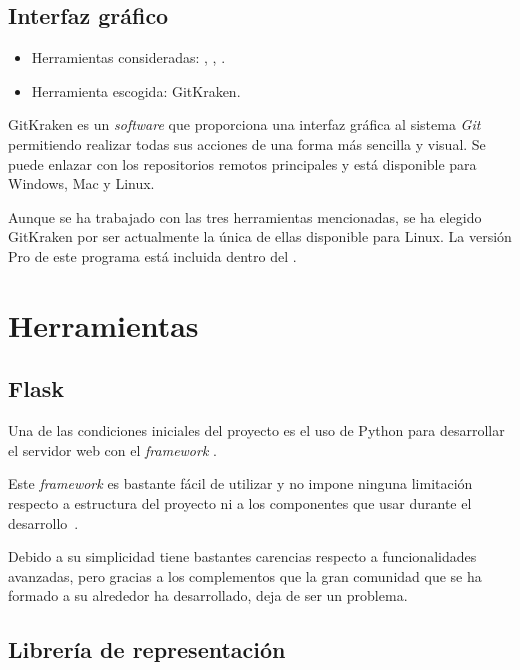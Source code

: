 \subsection{Interfaz gráfico}

\begin{itemize}
	\tightlist
	\item Herramientas consideradas:
	,
	,
	.
	\item Herramienta escogida: GitKraken.
\end{itemize}

GitKraken es un \textit{software} que proporciona una interfaz gráfica al
sistema \textit{Git} permitiendo realizar todas sus acciones de una forma más
sencilla y visual. Se puede enlazar con los repositorios remotos principales y
está disponible para Windows, Mac y Linux.

Aunque se ha trabajado con las tres herramientas mencionadas, se ha elegido 
GitKraken por ser actualmente la única de ellas disponible para Linux. La 
versión Pro de este programa está incluida dentro del 
.

\section{Herramientas}

\subsection{Flask}

Una de las condiciones iniciales del proyecto es el uso de Python para
desarrollar el servidor web con el \textit{framework}
.

Este \textit{framework} es bastante fácil de utilizar y no impone ninguna
limitación respecto a estructura del proyecto ni a los componentes que usar
durante el desarrollo~\cite{grinberg2014flask}.

Debido a su simplicidad tiene bastantes carencias respecto a funcionalidades
avanzadas, pero gracias a los complementos que la gran comunidad que se ha
formado a su alrededor ha desarrollado, deja de ser un problema.

\subsection{Librería de representación}

